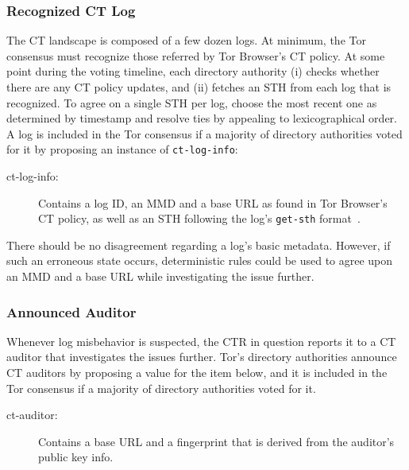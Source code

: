 
\subsubsection{Recognized CT Log}
The CT landscape is composed of a few dozen logs.  At minimum, the Tor
consensus must recognize those referred by Tor Browser's CT policy.  At some
point during the voting timeline, each directory authority
(i) checks whether there are any CT policy updates, and
(ii) fetches an STH from each log that is recognized.
To agree on a single STH per log, choose the most recent one as determined by
timestamp and resolve ties by appealing to lexicographical order.  A log is
included in the Tor consensus if a majority of directory authorities voted
for it by proposing an instance of \texttt{ct-log-info}:
\begin{description}
	\item[ct-log-info:] Contains a log ID, an MMD and a base URL as found in
		Tor Browser's CT policy, as well as an STH following the log's
		\texttt{get-sth} format~\cite{ct,ct/bis}.
\end{description}

There should be no disagreement regarding a log's basic metadata.  However, if
such an erroneous state occurs, deterministic rules could be used to agree upon
an MMD and a base URL while investigating the issue further.

\subsubsection{Announced Auditor}
Whenever log misbehavior is suspected, the CTR in question reports it to a
CT auditor that investigates the issues further.  Tor's directory authorities
announce CT auditors by proposing a value for the item below, and it is included
in the Tor consensus if a majority of directory authorities voted for it.
\begin{description}
	\item[ct-auditor:] Contains a base URL and a fingerprint that is derived
		from the auditor's public key info.
\end{description}

